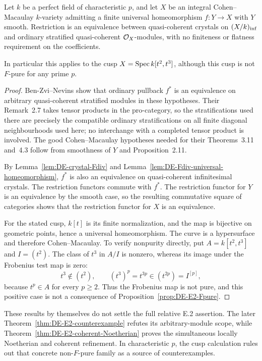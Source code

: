 \begin{proposition}\label{prop:DE-E2-cusps}
Let $k$ be a perfect field of characteristic $p$, and let $X$ be an integral Cohen--Macaulay $k$-variety admitting a finite universal homeomorphism $f:Y\to X$ with $Y$ smooth.  Restriction is an equivalence between quasi-coherent crystals on $(X/k)_{\rm inf}$ and ordinary stratified quasi-coherent $\mathcal O_X$-modules, with no finiteness or flatness requirement on the coefficients.

In particular this applies to the cusp $X=\operatorname{Spec} k[t^2,t^3]$, although this cusp is not $F$-pure for any prime $p$.
\end{proposition}
\begin{proof}
Ben-Zvi--Nevins \cite[Proposition~2.11, Theorem~3.11, Theorem~4.3 and Remark~4.5]{BenZviNevins2004} show that ordinary pullback $f^*$ is an equivalence on arbitrary quasi-coherent stratified modules in these hypotheses.  Their Remark~2.7 takes tensor products in the pro-category, so the stratifications used there are precisely the compatible ordinary stratifications on all finite diagonal neighbourhoods used here; no interchange with a completed tensor product is involved.  The good Cohen--Macaulay hypotheses needed for their Theorems~3.11 and~4.3 follow from smoothness of $Y$ and Proposition~2.11.

By Lemma~\ref{lem:DE-crystal-Fdiv} and Lemma~\ref{lem:DE-Fdiv-universal-homeomorphism}, $f^*$ is also an equivalence on quasi-coherent infinitesimal crystals.  The restriction functors commute with $f^*$.  The restriction functor for $Y$ is an equivalence by the smooth case, so the resulting commutative square of categories shows that the restriction functor for $X$ is an equivalence.

For the stated cusp, $k[t]$ is its finite normalization, and the map is bijective on geometric points, hence a universal homeomorphism.  The curve is a hypersurface and therefore Cohen--Macaulay.  To verify nonpurity directly, put $A=k[t^2,t^3]$ and $I=(t^2)$.  The class of $t^3$ in $A/I$ is nonzero, whereas its image under the Frobenius test map is zero:
\[
       t^3\notin(t^2),\qquad
       (t^3)^p=t^{3p}\in(t^{2p})=I^{[p]},
\]
because $t^p\in A$ for every $p\geq2$.  Thus the Frobenius map is not pure, and this positive case is not a consequence of Proposition~\ref{prop:DE-E2-Fpure}.
\end{proof}

These results by themselves do not settle the full relative E.2 assertion.  The later Theorem~\ref{thm:DE-E2-counterexample} refutes its arbitrary-module scope, while Theorem~\ref{thm:DE-E2-coherent-Noetherian} proves the simultaneous locally Noetherian and coherent refinement.  In characteristic $p$, the cusp calculation rules out that concrete non-$F$-pure family as a source of counterexamples.

